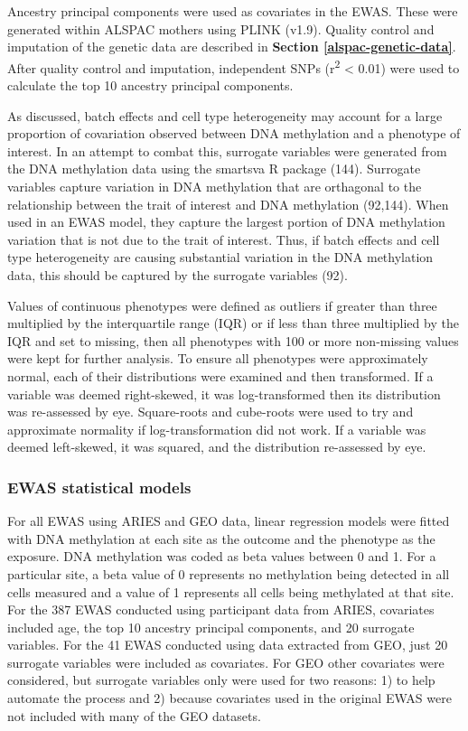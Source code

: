\documentclass[11pt,oneside]{bristolthesis}
\begin{document}
Ancestry principal components were used as covariates in the EWAS. These were generated within ALSPAC mothers using PLINK (v1.9). Quality control and imputation of the genetic data are described in \textbf{Section \ref{alspac-genetic-data}}. After quality control and imputation, independent SNPs (r\textsuperscript{2} \textless{} 0.01) were used to calculate the top 10 ancestry principal components.

As discussed, batch effects and cell type heterogeneity may account for a large proportion of covariation observed between DNA methylation and a phenotype of interest. In an attempt to combat this, surrogate variables were generated from the DNA methylation data using the smartsva R package (144). Surrogate variables capture variation in DNA methylation that are orthagonal to the relationship between the trait of interest and DNA methylation (92,144). When used in an EWAS model, they capture the largest portion of DNA methylation variation that is not due to the trait of interest. Thus, if batch effects and cell type heterogeneity are causing substantial variation in the DNA methylation data, this should be captured by the surrogate variables (92).

Values of continuous phenotypes were defined as outliers if greater than three multiplied by the interquartile range (IQR) or if less than three multiplied by the IQR and set to missing, then all phenotypes with 100 or more non-missing values were kept for further analysis. To ensure all phenotypes were approximately normal, each of their distributions were examined and then transformed. If a variable was deemed right-skewed, it was log-transformed then its distribution was re-assessed by eye. Square-roots and cube-roots were used to try and approximate normality if log-transformation did not work. If a variable was deemed left-skewed, it was squared, and the distribution re-assessed by eye.

\hypertarget{ewas-statistical-models}{%
\subsubsection{EWAS statistical models}\label{ewas-statistical-models}}

For all EWAS using ARIES and GEO data, linear regression models were fitted with DNA methylation at each site as the outcome and the phenotype as the exposure. DNA methylation was coded as beta values between 0 and 1. For a particular site, a beta value of 0 represents no methylation being detected in all cells measured and a value of 1 represents all cells being methylated at that site. For the 387 EWAS conducted using participant data from ARIES, covariates included age, the top 10 ancestry principal components, and 20 surrogate variables. For the 41 EWAS conducted using data extracted from GEO, just 20 surrogate variables were included as covariates. For GEO other covariates were considered, but surrogate variables only were used for two reasons: 1) to help automate the process and 2) because covariates used in the original EWAS were not included with many of the GEO datasets.
\end{document}
